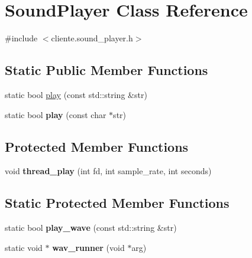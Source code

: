 \hypertarget{classSoundPlayer}{\section{Sound\-Player Class Reference}
\label{classSoundPlayer}
}


{\ttfamily \#include $<$cliente.\-sound\-\_\-player.\-h$>$}

\subsection*{Static Public Member Functions}
\begin{DoxyCompactItemize}
\item 
static bool \hyperlink{classSoundPlayer_abe94eb635c2c94b9ae4e852b35a2402f}{play} (const std\-::string \&str)
\item 
\hypertarget{classSoundPlayer_a8a59acf29748daccddc07c0595ce834e}{static bool {\bfseries play} (const char $\ast$str)}\label{classSoundPlayer_a8a59acf29748daccddc07c0595ce834e}

\end{DoxyCompactItemize}
\subsection*{Protected Member Functions}
\begin{DoxyCompactItemize}
\item 
\hypertarget{classSoundPlayer_a7a15151efe24e566febd36238ff6056a}{void {\bfseries thread\-\_\-play} (int fd, int sample\-\_\-rate, int seconds)}\label{classSoundPlayer_a7a15151efe24e566febd36238ff6056a}

\end{DoxyCompactItemize}
\subsection*{Static Protected Member Functions}
\begin{DoxyCompactItemize}
\item 
\hypertarget{classSoundPlayer_a9bda2f100c481f1142712f03e94ff3d0}{static bool {\bfseries play\-\_\-wave} (const std\-::string \&str)}\label{classSoundPlayer_a9bda2f100c481f1142712f03e94ff3d0}

\item 
\hypertarget{classSoundPlayer_ad7ae434f37549077a8296af13dbbeed5}{static void $\ast$ {\bfseries wav\-\_\-runner} (void $\ast$arg)}\label{classSoundPlayer_ad7ae434f37549077a8296af13dbbeed5}

\end{DoxyCompactItemize}
